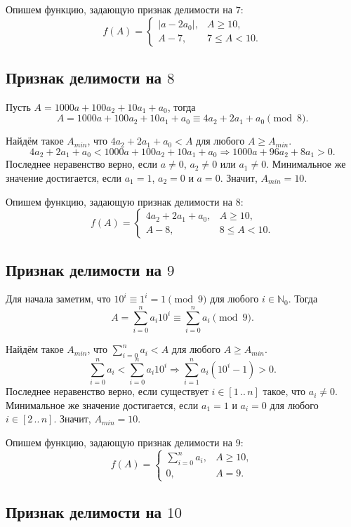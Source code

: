 \documentclass[14pt, a4paper]{extarticle}
\theoremstyle{definition}
\begin{document}
	Опишем функцию, задающую признак делимости на $7$:
	$$f(A)=\begin{cases}
		|a-2a_0|,&A\geqslant10,\\
		A-7,&7\leqslant A<10.
	\end{cases}$$

\subsection{Признак делимости на $8$}

	Пусть $A=1000a+100a_2+10a_1+a_0$, тогда
	$$A=1000a+100a_2+10a_1+a_0\equiv4a_2+2a_1+a_0\pmod8.$$

	Найдём такое $A_{min}$, что $4a_2+2a_1+a_0<A$ для любого $A\geqslant A_{min}$. 
	$$4a_2+2a_1+a_0<1000a+100a_2+10a_1+a_0\Rightarrow1000a+96a_2+8a_1>0.$$
	Последнее неравенство верно, если $a\neq0$, $a_2\neq0$ или $a_1\neq0$. Минимальное же значение достигается, если $a_1=1$, $a_2=0$ и $a=0$. Значит, $A_{min}=10$.

	Опишем функцию, задающую признак делимости на $8$:
	$$f(A)=\begin{cases}
		4a_2+2a_1+a_0,&A\geqslant10,\\
		A-8,&8\leqslant A<10.
	\end{cases}$$

\subsection{Признак делимости на $9$}
	
	Для начала заметим, что $10^i\equiv1^i=1\pmod9$ для любого $i\in\mathbb{N}_0$. Тогда
	$$A=\sum_{i=0}^na_i10^i\equiv\sum_{i=0}^na_i\pmod9.$$

	Найдём такое $A_{min}$, что $\sum_{i=0}^na_i<A$ для любого $A\geqslant A_{min}$. 
	$$\sum_{i=0}^na_i<\sum_{i=0}^na_i10^i\Rightarrow\sum_{i=1}^na_i(10^i-1)>0.$$
	Последнее неравенство верно, если существует $i\in[1\,..\,n]$ такое, что $a_i\neq0$. Минимальное же значение достигается, если $a_1=1$ и $a_i=0$ для любого $i\in[2\,..\,n]$. Значит, $A_{min}=10$.

	Опишем функцию, задающую признак делимости на $9$:
	$$f(A)=\begin{cases}
		\sum_{i=0}^na_i,&A\geqslant10,\\
		0,&A=9.
	\end{cases}$$

\subsection{Признак делимости на $10$}
	
\end{document}
